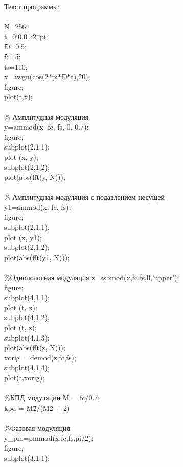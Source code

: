 \documentclass[12pt,a4paper]{report}
\begin{document}
Текст программы:\\\\
N=256;\\
t=0:0.01:2*pi;\\
f0=0.5;\\
fc=5;\\
fs=110;\\
x=awgn(cos(2*pi*f0*t),20);\\
figure;\\
plot(t,x);\\\\
\% Амплитудная модуляция\\
y=ammod(x, fc, fs, 0, 0.7);\\
figure;\\
subplot(2,1,1);\\
plot (x, y);\\
subplot(2,1,2);\\
plot(abs(fft(y, N)));\\\\
\% Амплитудная модуляция с подавлением несущей\\
y1=ammod(x, fc, fs);\\
figure;\\
subplot(2,1,1);\\
plot (x, y1);\\
subplot(2,1,2);\\
plot(abs(fft(y1, N)));\\\\
\%Однополосная модуляция
z=ssbmod(x,fc,fs,0,'upper');\\
figure;\\
subplot(4,1,1);\\
plot (t, x);\\
subplot(4,1,2);\\
plot (t, z);\\
subplot(4,1,3);\\
plot(abs(fft(z, N)));\\
xorig = demod(z,fc,fs);\\
subplot(4,1,4);\\
plot(t,xorig);\\\\
\%КПД модуляции
M = fc/0.7;\\
kpd = M\^2/(M\^2 + 2)\\\\
\%Фазовая модуляция\\
y\_pm=pmmod(x,fc,fs,pi/2);\\
figure;\\
subplot(3,1,1);\\
\end{document}
